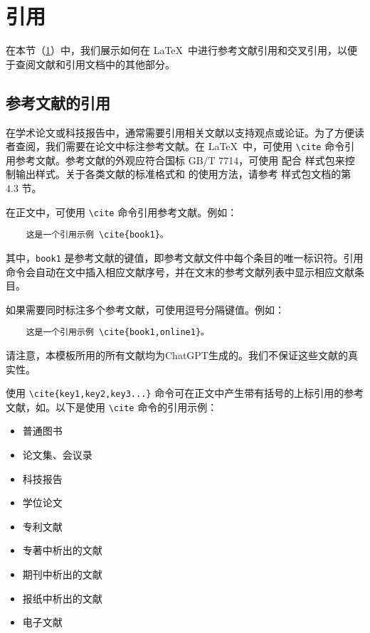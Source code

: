 \section{引用}\label{sec:reference}

在本节（\cref{sec:reference}）中，我们展示如何在 \LaTeX\ 中进行参考文献引用和交叉引用，以便于查阅文献和引用文档中的其他部分。

\subsection{参考文献的引用}

在学术论文或科技报告中，通常需要引用相关文献以支持观点或论证。为了方便读者查阅，我们需要在论文中标注参考文献。在 \LaTeX\ 中，可使用 \verb|\cite| 命令引用参考文献。参考文献的外观应符合国标 GB/T 7714，可使用 \BibLaTeX{} 配合  样式包来控制输出样式。关于各类文献的标准格式和 \BibLaTeX{} 的使用方法，请参考  样式包文档的第 4.3 节。

在正文中，可使用 \verb|\cite| 命令引用参考文献。例如：

\begin{Verbatim}
    这是一个引用示例 \cite{book1}。
\end{Verbatim}

其中，\verb|book1| 是参考文献的键值，即参考文献文件中每个条目的唯一标识符。引用命令会自动在文中插入相应文献序号，并在文末的参考文献列表中显示相应文献条目。

如果需要同时标注多个参考文献，可使用逗号分隔键值。例如：

\begin{Verbatim}
    这是一个引用示例 \cite{book1,online1}。
\end{Verbatim}

请注意，本模板所用的所有文献均为ChatGPT生成的。我们不保证这些文献的真实性。

使用 \verb|\cite{key1,key2,key3...}| 命令可在正文中产生带有括号的上标引用的参考文献，如\cite{book1,online1,article1}。以下是使用 \verb|\cite| 命令的引用示例：

\begin{itemize}
    \item 普通图书\cite{book1,book2}
    \item 论文集、会议录\cite{conf1,conf2}
    \item 科技报告\cite{techreport1,techreport2}
    \item 学位论文\cite{thesis1,thesis2,thesis3}
    \item 专利文献\cite{patent1,patent2}
    \item 专著中析出的文献\cite{inbook1,inbook2}
    \item 期刊中析出的文献\cite{qin2021,article1,article2}
    \item 报纸中析出的文献\cite{newspaper1,newspaper2}
    \item 电子文献\cite{online1,online2,online3}
\end{itemize}

